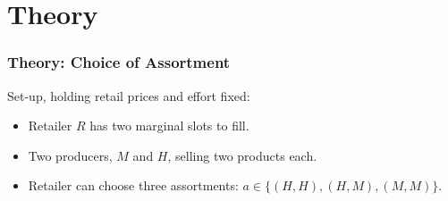 \section{Theory}

\begin{frame}[label=intuition]
\frametitle{Theory: Choice of Assortment}
Set-up, holding retail prices and effort fixed:
\begin{itemize}
\item Retailer $R$ has two marginal slots to fill.
\item Two producers, $M$ and $H$, selling two products each.
\item Retailer can choose three assortments: $a \in \{ (H,H), (H,M), (M,M)\}$.
\end{itemize}
\end{frame}



